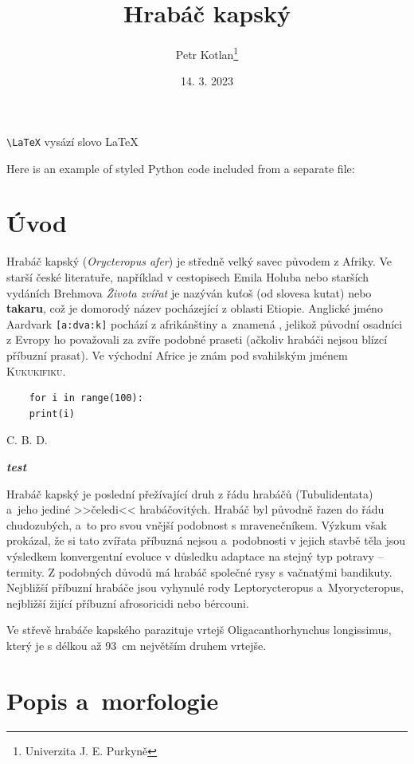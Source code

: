 \documentclass[a4paper, 12pt]{article}
\title{Hrabáč kapský}
\author{Petr Kotlan\thanks{Univerzita J. E. Purkyně}}
\date{14. 3. 2023}
\newcommand{\EPA}{{\LARGE C. B. D.}}
\newcommand{\zvyrazni}[1]{\textbf{\textit{#1}}}
\begin{document}
\pagecolor{moleskin!60}

\maketitle

\tableofcontents

\verb#\LaTeX# vysází slovo \LaTeX

Here is an example of styled Python code included from a separate file:




\section{Úvod}
Hrabáč kapský (\emph{Orycteropus afer}) je středně velký savec původem z Afriky. Ve starší české literatuře,
například v cestopisech Emila Holuba nebo starších vydáních Brehmova \textit{Života zvířat} je nazýván kuťoš (od slovesa kutat)
nebo \textbf{takaru}, což je domorodý název pocházející z oblasti Etiopie.
Anglické jméno Aardvark \texttt{[a:dva:k]} pochází z afrikánštiny a~znamená ,
jelikož původní osadníci z Evropy ho považovali za zvíře podobné praseti
(ačkoliv hrabáči nejsou blízcí příbuzní prasat).
Ve východní Africe je znám pod svahilským jménem \textsc{Kukukifiku}.

\begin{verbatim}
    for i in range(100):
    print(i)
\end{verbatim}


\EPA

\zvyrazni{test}

\textsf{Hrabáč kapský} je poslední přežívající druh z řádu hrabáčů (Tubulidentata) a~jeho jediné >>čeledi<< hrabáčovitých.
Hrabáč byl původně řazen do řádu chudozubých, a~to pro svou vnější podobnost s mravenečníkem.
Výzkum však prokázal, že si tato zvířata příbuzná nejsou a~podobnosti v jejich stavbě
těla jsou výsledkem konvergentní evoluce v důsledku adaptace na stejný typ potravy -- termity.
Z podobných důvodů má hrabáč společné rysy s vačnatými bandikuty. Nejbližší příbuzní hrabáče
jsou vyhynulé rody Leptorycteropus a~Myorycteropus, nejbližší žijící příbuzní afrosoricidi nebo bércouni.

Ve střevě hrabáče kapského parazituje vrtejš Oligacanthorhynchus longissimus,
který je s délkou až 93~cm největším druhem vrtejše.

\section{Popis a~morfologie}
\end{document}
